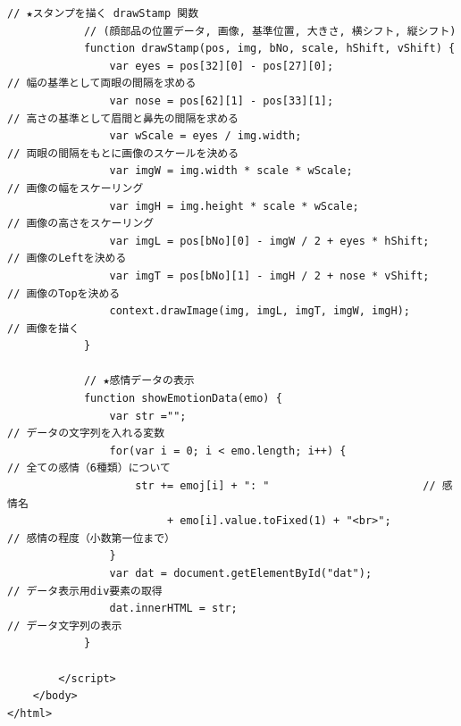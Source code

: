 \documentclass[mingoth,11pt,a4j,uplatex]{jsarticle}
\begin{document}
\begin{lstlisting}[caption=07-06.html]
            // ★スタンプを描く drawStamp 関数
            // (顔部品の位置データ, 画像, 基準位置, 大きさ, 横シフト, 縦シフト)
            function drawStamp(pos, img, bNo, scale, hShift, vShift) {
                var eyes = pos[32][0] - pos[27][0];                   // 幅の基準として両眼の間隔を求める
                var nose = pos[62][1] - pos[33][1];                   // 高さの基準として眉間と鼻先の間隔を求める
                var wScale = eyes / img.width;                        // 両眼の間隔をもとに画像のスケールを決める
                var imgW = img.width * scale * wScale;                // 画像の幅をスケーリング
                var imgH = img.height * scale * wScale;               // 画像の高さをスケーリング
                var imgL = pos[bNo][0] - imgW / 2 + eyes * hShift;    // 画像のLeftを決める
                var imgT = pos[bNo][1] - imgH / 2 + nose * vShift;    // 画像のTopを決める
                context.drawImage(img, imgL, imgT, imgW, imgH);       // 画像を描く
            }

            // ★感情データの表示
            function showEmotionData(emo) {
                var str ="";                                          // データの文字列を入れる変数
                for(var i = 0; i < emo.length; i++) {                 // 全ての感情（6種類）について
                    str += emoj[i] + ": "                        // 感情名
                         + emo[i].value.toFixed(1) + "<br>";            // 感情の程度（小数第一位まで）
                }
                var dat = document.getElementById("dat");             // データ表示用div要素の取得
                dat.innerHTML = str;                                  // データ文字列の表示
            }
            
        </script>
    </body>
</html>
\end{lstlisting}




\end{document}
